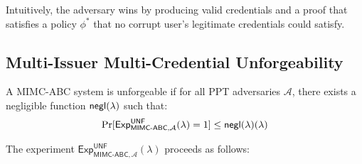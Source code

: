 \noindent Intuitively, the adversary wins by producing valid credentials and a proof that satisfies a policy $\phi^*$ that no corrupt user's legitimate credentials could satisfy.































\subsection{Multi-Issuer Multi-Credential Unforgeability}

\begin{definition}[Unforgeability]
A MIMC-ABC system is unforgeable if for all PPT adversaries $\mathcal{A}$, there exists a negligible function ${\mathsf{negl}(\lambda)}$ such that:
\[
\Pr[\mathsf{Exp}^{\mathsf{UNF}}_{\mathsf{MIMC\text{-}ABC}, \mathcal{A}}(\lambda) = 1] \leq {\mathsf{negl}(\lambda)}(\lambda)
\]
\end{definition}

\noindent The experiment $\mathsf{Exp}^{\mathsf{UNF}}_{\mathsf{MIMC\text{-}ABC}, \mathcal{A}}(\lambda)$ proceeds as follows:

